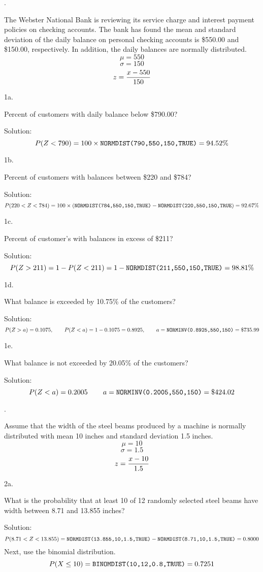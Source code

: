 .

The Webster National Bank is reviewing its service charge and interest
payment policies on checking accounts.
The bank has found the mean and standard deviation of the daily balance
on personal checking accounts is \$550.00 and \$150.00, respectively.
In addition, the daily balances are normally distributed.
$$\mu=550$$
$$\sigma=150$$
$$z={x-550\over150}$$

\beginsection 1a.

Percent of customers with daily balance
below \$790.00?

\bigskip
Solution:
$$P(Z<790)=100\times\hbox{\tt NORMDIST(790,550,150,TRUE)}=94.52\%$$

\beginsection 1b.

Percent of customers with balances between \$220 and \$784?

\bigskip
Solution:
$$P(220<Z<784)=100\times(\hbox{\tt NORMDIST(784,550,150,TRUE)}
-\hbox{\tt NORMDIST(220,550,150,TRUE})=92.67\%$$

\beginsection 1c.

Percent of customer's with balances in excess of \$211?

\bigskip
Solution:
$$P(Z>211)=1-P(Z<211)=1-\hbox{\tt NORMDIST(211,550,150,TRUE)}=98.81\%$$

\beginsection 1d.

What balance is exceeded by 10.75\% of the customers?

\bigskip
Solution:
$$P(Z>a)=0.1075,\qquad P(Z<a)=1-0.1075=0.8925,\qquad a=\hbox{\tt NORMINV(0.8925,550,150)}
=\$735.99$$

\beginsection 1e.

What balance is not exceeded by 20.05\% of the customers?

\bigskip
Solution:
$$P(Z<a)=0.2005\,\qquad a=\hbox{\tt NORMINV(0.2005,550,150)}=\$424.02$$

\vfill
\eject

.

Assume that the width of the steel beams produced by a machine is normally
distributed with mean 10 inches and standard deviation 1.5 inches.
$$\mu=10$$
$$\sigma=1.5$$
$$z={x-10\over1.5}$$

\beginsection 2a.

What is the probability that at least 10 of 12 randomly selected steel
beams have width between 8.71 and 13.855 inches?

\bigskip
Solution:
$$P(8.71<Z<13.855)=\hbox{\tt NORMDIST(13.855,10,1.5,TRUE)}-
\hbox{\tt NORMDIST(8.71,10,1.5,TRUE)}=0.8000$$
Next, use the binomial distribution.
$$P(X\le10)=\hbox{\tt BINOMDIST(10,12,0.8,TRUE)}=0.7251$$

